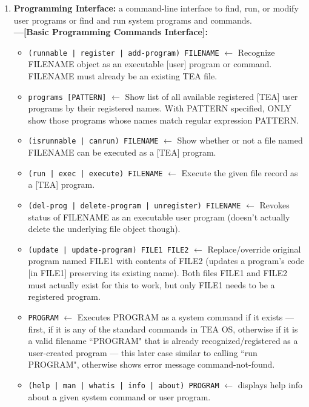 \documentclass{article}
\begin{document}
\begin{enumerate}
{}

\item {  \textbf{Programming Interface:} a command-line interface to find, run, or modify user programs or find and run system programs and commands.\\
\textbf{---[Basic Programming Commands Interface]:}
\begin{itemize}
\item \texttt{(runnable | register | add-program) FILENAME} $\leftarrow$ Recognize FILENAME object as an executable [user] program or command. FILENAME must already be an existing TEA file.
\item \texttt{programs [PATTERN]} $\leftarrow$ Show list of all available registered [TEA]  user programs by their registered names. With PATTERN specified, ONLY show those programs whose names match regular expression PATTERN.
\item \texttt{(isrunnable | canrun) FILENAME} $\leftarrow$ Show whether or not a file named FILENAME can be executed as a [TEA] program.
\item \texttt{(run | exec | execute) FILENAME} $\leftarrow$ Execute the given file record as a [TEA] program.
\item \texttt{(del-prog | delete-program | unregister) FILENAME} $\leftarrow$ Revokes status of FILENAME as an executable user program (doesn't actually delete the underlying file object though).
\item \texttt{(update | update-program) FILE1 FILE2} $\leftarrow$ Replace/override original program named FILE1 with contents of FILE2 (updates a program's code [in FILE1] preserving its existing name). Both files FILE1 and FILE2 must actually exist for this to work, but only FILE1 needs to be a registered program.
\item \texttt{PROGRAM} $\leftarrow$ Executes PROGRAM as a system command if it exists --- first, if it is any of the standard commands in TEA OS, otherwise if it is a valid filename ``PROGRAM" that is already recognized/registered as a user-created program --- this later case similar to calling ``run PROGRAM", otherwise shows error message command-not-found.
\item \texttt{(help | man | whatis | info | about) PROGRAM} $\leftarrow$ displays help info about a given system command or user program.
\end{itemize}

}




\end{enumerate}
\end{document}
